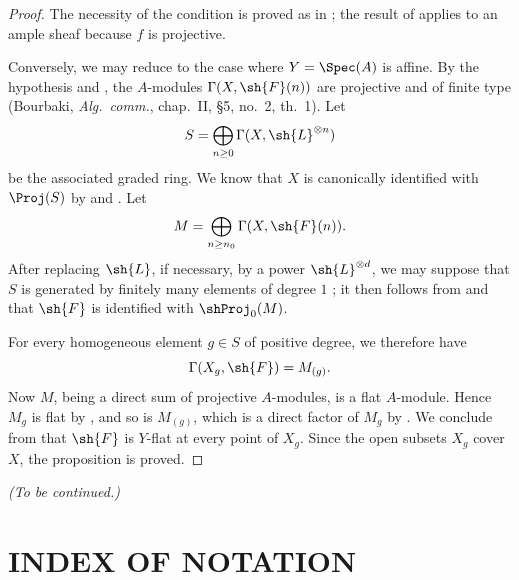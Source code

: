 \begin{proof}
The necessity of the condition is proved as in
; the result of  applies
to an ample sheaf because $f$ is projective.

Conversely, we may reduce to the case where
$Y=\Spec(A)$ is affine.  By the hypothesis and
, the $A$-modules
$\Gamma(X,\sh{F}(n))$ are projective and of finite type
(Bourbaki, \emph{Alg.~comm.}, chap.~II, \S5, no.~2,
th.~1).  Let
\[
  S=\bigoplus_{n\geq0}\Gamma(X,\sh{L}^{\otimes n})
\]
be the associated graded ring.  We know that $X$ is
canonically identified with $\Proj(S)$ by
 and .  Let
\[
  M=\bigoplus_{n\geq n_0}\Gamma(X,\sh{F}(n)).
\]
After replacing $\sh{L}$, if necessary, by a power
$\sh{L}^{\otimes d}$, we may suppose that $S$ is
generated by finitely many elements of degree $1$
; it then follows from
 and  that $\sh{F}$ is
identified with $\shProj_0(M)$.

For every homogeneous element $g\in S$ of positive
degree, we therefore have
\[
  \Gamma(X_g,\sh{F})=M_{(g)}.
\]
Now $M$, being a direct sum of projective $A$-modules, is
a flat $A$-module.  Hence $M_g$ is flat by
, and so is $M_{(g)}$, which is a direct
factor of $M_g$ by .  We conclude from
 that $\sh{F}$ is $Y$-flat at every
point of $X_g$.  Since the open subsets $X_g$ cover $X$,
the proposition is proved.
\end{proof}

\bigskip
\noindent\emph{(To be continued.)}

\clearpage
{}
\section*{INDEX OF NOTATION}

